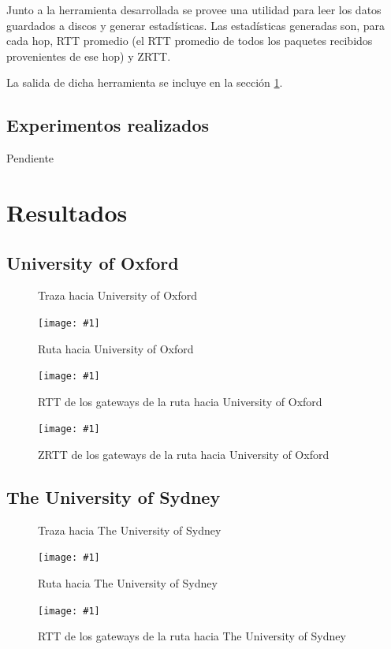 \documentclass[a4paper, 10pt, twoside]{article}
\newcommand{\estadisticas}[3]{
  \begin{figure}[H]
    \small
    
    \normalsize
    \caption{#2}
    \label{#3}
  \end{figure}
}
\newcommand{\grafico}[3]{
  \begin{figure}[H]
    \texttt{[image: \#1]}
    \caption{#2}
    \label{#3}
  \end{figure}
}
\newcommand{\oxford}{University of Oxford}
\newcommand{\sydney}{The University of Sydney}
\begin{document}
Junto a la herramienta desarrollada se provee una utilidad para leer los datos guardados a discos y generar estadísticas. Las estadísticas generadas son, para cada hop, RTT promedio (el RTT promedio de todos los paquetes recibidos provenientes de ese hop) y ZRTT.

La salida de dicha herramienta se incluye en la sección \ref{sec:resultados}.


\subsection{Experimentos realizados}

Pendiente




\section{Resultados}
\label{sec:resultados}


\subsection{\oxford}

\estadisticas{statistics-www.ox.ac.uk.txt}
             {Traza hacia \oxford}
             {fig:trace-oxford}

\grafico{map-www.ox.ac.uk}
        {Ruta hacia \oxford}
        {fig:map-oxford}

\grafico{rtt-www.ox.ac.uk}
        {RTT de los gateways de la ruta hacia \oxford}
        {fig:rtt-oxford}

\grafico{zrtt-www.ox.ac.uk}
        {ZRTT de los gateways de la ruta hacia \oxford}
        {fig:zrtt-oxford}


\subsection{\sydney}

\estadisticas{statistics-www.sydney.edu.au.txt}
             {Traza hacia \sydney}
             {fig:trace-sydney}

\grafico{map-www.sydney.edu.au}
        {Ruta hacia \sydney}
        {fig:map-sydney}

\grafico{rtt-www.sydney.edu.au}
        {RTT de los gateways de la ruta hacia \sydney}
        {fig:rtt-sydney}
\end{document}
